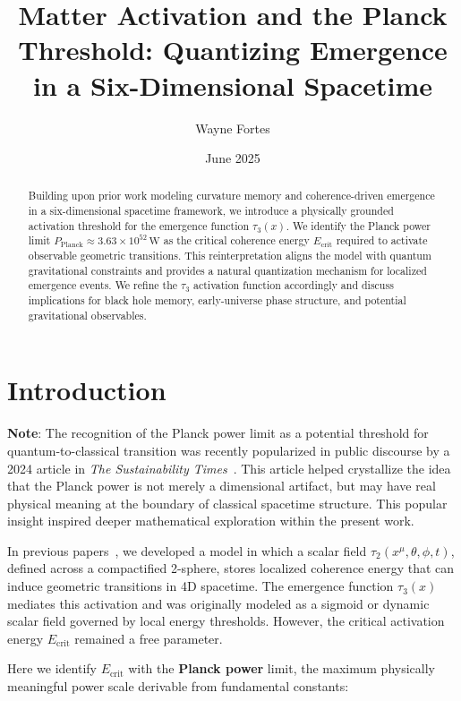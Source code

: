 \documentclass[12pt]{article}
\title{\textbf{Matter Activation and the Planck Threshold: Quantizing Emergence in a Six-Dimensional Spacetime}}
\author{Wayne Fortes}
\date{June 2025}
\begin{document}
\maketitle

\begin{abstract}
Building upon prior work modeling curvature memory and coherence-driven emergence in a six-dimensional spacetime framework, we introduce a physically grounded activation threshold for the emergence function $\tau_3(x)$. We identify the Planck power limit $P_\text{Planck} \approx 3.63 \times 10^{52} \, \text{W}$ as the critical coherence energy $E_\text{crit}$ required to activate observable geometric transitions. This reinterpretation aligns the model with quantum gravitational constraints and provides a natural quantization mechanism for localized emergence events. We refine the $\tau_3$ activation function accordingly and discuss implications for black hole memory, early-universe phase structure, and potential gravitational observables.
\end{abstract}

\section{Introduction}

\textbf{Note}: The recognition of the Planck power limit as a potential threshold for quantum-to-classical transition was recently popularized in public discourse by a 2024 article in \textit{The Sustainability Times}~\cite{Sustainability}. This article helped crystallize the idea that the Planck power is not merely a dimensional artifact, but may have real physical meaning at the boundary of classical spacetime structure. This popular insight inspired deeper mathematical exploration within the present work.

In previous papers~\cite{Paper1,Paper2,Paper3,Paper3Addendum,Paper4}, we developed a model in which a scalar field $\tau_2(x^\mu, \theta, \phi, t)$, defined across a compactified 2-sphere, stores localized coherence energy that can induce geometric transitions in 4D spacetime. The emergence function $\tau_3(x)$ mediates this activation and was originally modeled as a sigmoid or dynamic scalar field governed by local energy thresholds. However, the critical activation energy $E_\text{crit}$ remained a free parameter.

Here we identify $E_\text{crit}$ with the \textbf{Planck power} limit, the maximum physically meaningful power scale derivable from fundamental constants:
\end{document}
